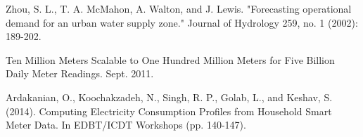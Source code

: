 \documentclass[a4paper,12pt]{llncs}
\begin{document}
\medskip
\begin{thebibliography}{1}

Zhou, S. L., T. A. McMahon, A. Walton, and J. Lewis. "Forecasting operational demand for an urban water supply zone." Journal of Hydrology 259, no. 1 (2002): 189-202.

Ten Million Meters Scalable to One Hundred Million Meters for Five Billion Daily Meter Readings. Sept. 2011.

Ardakanian, O., Koochakzadeh, N., Singh, R. P., Golab, L., and Keshav, S. (2014). Computing Electricity Consumption Profiles from Household Smart Meter Data. In EDBT/ICDT Workshops (pp. 140-147).

\end{thebibliography}
\end{document}
